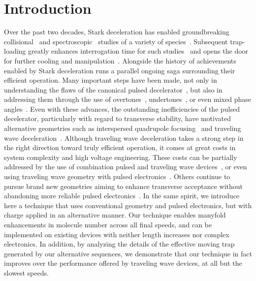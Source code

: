 \documentclass[%
 reprint,
 amsmath,amssymb,
 aps,
pra,
]{revtex4-1}
\begin{document}
\section{Introduction}
Over the past two decades, Stark deceleration has enabled groundbreaking collisional~\cite{Sawyer2011,Kirste2012,Gao2018} and spectroscopic~\cite{Veldhoven2004,Hudson2006,Lev2006,Fast2018} studies of a variety of species~\cite{VanDeMeerakker2012}. Subsequent trap-loading greatly enhances interrogation time for such studies~\cite{Sawyer2008} and opens the door for further cooling and manipulation~\cite{Stuhl2012evap, Reens2017}. Alongside the history of achievements enabled by Stark deceleration runs a parallel ongoing saga surrounding their efficient operation. Many important steps have been made, not only in understanding the flaws of the canonical pulsed decelerator~\cite{VanDeMeerakker2006,Sawyer2008a}, but also in addressing them through the use of overtones~\cite{VanDeMeerakker2005a,Scharfenberg2009}, undertones~\cite{Zhang2016}, or even mixed phase angles~\cite{Parazzoli2009,Hou2013}. Even with these advances, the outstanding inefficiencies of the pulsed decelerator, particularly with regard to transverse stability, have motivated alternative geometries such as interspersed quadrupole focusing~\cite{Sawyer2008a} and traveling wave deceleration~\cite{Osterwalder2010,VandenBerg2014,Fabrikant2014}. Although traveling wave deceleration takes a strong step in the right direction toward truly efficient operation, it comes at great costs in system complexity and high voltage engineering. These costs can be partially addressed by the use of combination pulsed and traveling wave devices~\cite{Quintero-Perez2013}, or even using traveling wave geometry with pulsed electronics~\cite{Shyur2017}. Others continue to pursue brand new geometries aiming to enhance transverse acceptance without abandoning more reliable pulsed electronics~\cite{Wang2016}. In the same spirit, we introduce here a technique that uses conventional geometry and pulsed electronics, but with charge applied in an alternative manner. Our technique enables manyfold enhancements in molecule number across all final speeds, and can be implemented on existing devices with neither length increases nor complex electronics. In addition, by analyzing the details of the effective moving trap generated by our alternative sequences, we demonstrate that our technique in fact improves over the performance offered by traveling wave devices, at all but the slowest speeds.
\end{document}
